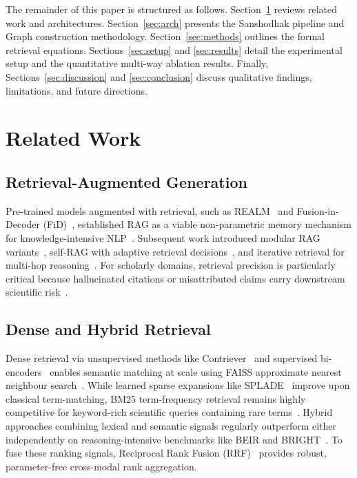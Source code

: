 \documentclass[journal]{IEEEtran}
\begin{document}
The remainder of this paper is structured as follows. Section~\ref{sec:related} reviews related work and architectures. Section~\ref{sec:arch} presents the Sanshodhak pipeline and Graph construction methodology. Section~\ref{sec:methods} outlines the formal retrieval equations. Sections~\ref{sec:setup} and \ref{sec:results} detail the experimental setup and the quantitative multi-way ablation results. Finally, Sections~\ref{sec:discussion} and \ref{sec:conclusion} discuss qualitative findings, limitations, and future directions.

\section{Related Work}
\label{sec:related}

\subsection{Retrieval-Augmented Generation}
Pre-trained models augmented with retrieval, such as REALM~\cite{guu2020realm} and Fusion-in-Decoder (FiD)~\cite{izacard2021fid}, established RAG as a viable non-parametric memory mechanism for knowledge-intensive NLP~\cite{lewis2020rag}. Subsequent work introduced modular RAG variants~\cite{gao2023modular}, self-RAG with adaptive retrieval decisions~\cite{asai2023selfrag}, and iterative retrieval for multi-hop reasoning~\cite{trivedi2022interleaving}. For scholarly domains, retrieval precision is particularly critical because hallucinated citations or misattributed claims carry downstream scientific risk~\cite{khalifa2023sourcenli}.

\subsection{Dense and Hybrid Retrieval}
Dense retrieval via unsupervised methods like Contriever~\cite{izacard2022contriever} and supervised bi-encoders~\cite{karpukhin2020dpr, muennighoff2023mteb} enables semantic matching at scale using FAISS approximate nearest neighbour search~\cite{johnson2019faiss}. While learned sparse expansions like SPLADE~\cite{formal2021splade} improve upon classical term-matching, BM25 term-frequency retrieval remains highly competitive for keyword-rich scientific queries containing rare terms~\cite{robertson2009probabilistic}. Hybrid approaches combining lexical and semantic signals regularly outperform either independently on reasoning-intensive benchmarks like BEIR and BRIGHT~\cite{thakur2021beir, su2024bright}. To fuse these ranking signals, Reciprocal Rank Fusion (RRF)~\cite{cormack2009rrf} provides robust, parameter-free cross-modal rank aggregation.
\end{document}
